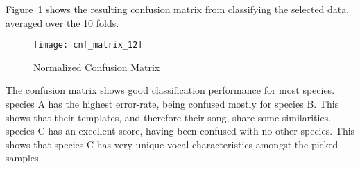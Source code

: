 Figure~\ref{fig:cnf12} shows the resulting confusion matrix from classifying the
selected data, averaged over the 10 folds.

\begin{figure}[!htb]
  \centering
  \texttt{[image: cnf\_matrix\_12]}
  \caption{Normalized Confusion Matrix}\label{fig:cnf12}
\end{figure}

The confusion matrix shows good classification performance for most species.\\

species A has the highest error-rate, being confused mostly for species B.
This shows that their templates, and therefore their song, share some
similarities.\\

species C has an excellent score, having been confused with no other species.
This shows that species C has very unique vocal characteristics amongst the
picked samples.
